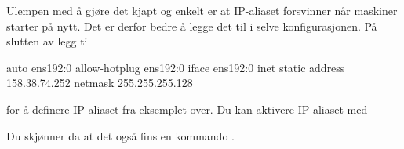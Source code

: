 Ulempen med å gjøre det kjapt og enkelt er at IP-aliaset forsvinner når maskiner starter
på nytt. Det er derfor bedre å legge det til i selve konfigurasjonen.
På slutten av  legg til

\begin{filedata}
auto ens192:0
allow-hotplug ens192:0
iface ens192:0 inet static
        address 158.38.74.252
        netmask 255.255.255.128
\end{filedata}

for å definere IP-aliaset fra eksemplet over. Du kan aktivere IP-aliaset med


Du skjønner da at det også fins en kommando .